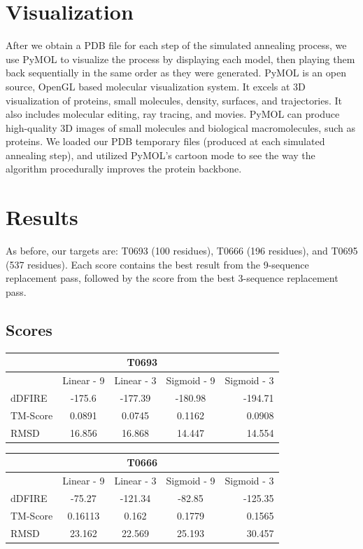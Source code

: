 \documentclass{article}
\begin{document}
\begin{enumerate}
\section{Visualization}

After we obtain a PDB file for each step of the simulated annealing process, we use PyMOL to visualize the process by displaying each model, then playing them back sequentially in the same order as they were generated.  PyMOL is an open source, OpenGL based molecular visualization system.  It excels at 3D visualization of proteins, small molecules, density, surfaces, and trajectories. It also includes molecular editing, ray tracing, and movies.  PyMOL can produce high-quality 3D images of small molecules and biological macromolecules, such as proteins.  We loaded our PDB temporary files (produced at each simulated annealing step), and utilized PyMOL's cartoon mode to see the way the algorithm procedurally improves the protein backbone.

\section{Results}

As before, our targets are: T0693 (100 residues), T0666 (196 residues), and T0695 (537 residues).  Each score contains the best result from the 9-sequence replacement pass, followed by the score from the best 3-sequence replacement pass.

\subsection{Scores}
\begin{center}
\begin{tabular}{|l|c|c|c|r|}
\multicolumn{5}{c}{T0693} \\
    \hline
      & Linear - 9 & Linear - 3 & Sigmoid - 9 & Sigmoid - 3\\ \hline
    dDFIRE & -175.6 & -177.39 & -180.98 & -194.71 \\ \hline
    TM-Score & 0.0891 & 0.0745 & 0.1162 & 0.0908 \\ \hline
    RMSD & 16.856 & 16.868 & 14.447 & 14.554 \\
    \hline
    \end{tabular}
\end{center}

\begin{center}
\begin{tabular}{|l|c|c|c|r|}
\multicolumn{5}{c}{T0666} \\
    \hline
      & Linear - 9 & Linear - 3 & Sigmoid - 9 & Sigmoid - 3\\ \hline
    dDFIRE & -75.27 & -121.34 & -82.85 & -125.35 \\ \hline
    TM-Score & 0.16113 & 0.162 & 0.1779 & 0.1565 \\ \hline
    RMSD & 23.162 & 22.569 & 25.193 & 30.457 \\
    \hline
    \end{tabular}
\end{center}


\end{enumerate}
\end{document}
